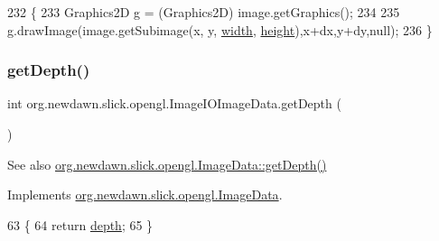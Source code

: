 \begin{DoxyCode}
232                                                                                                     \{
233         Graphics2D g = (Graphics2D) image.getGraphics();
234         
235         g.drawImage(image.getSubimage(x, y, \mbox{\hyperlink{classorg_1_1newdawn_1_1slick_1_1opengl_1_1_image_i_o_image_data_a4455bbf2c2f9c41df712d067260288f3}{width}}, \mbox{\hyperlink{classorg_1_1newdawn_1_1slick_1_1opengl_1_1_image_i_o_image_data_af79cc456f73fe9b84d5803f4fb41348b}{height}}),x+dx,y+dy,null);
236     \}
\end{DoxyCode}
\mbox{\label{classorg_1_1newdawn_1_1slick_1_1opengl_1_1_image_i_o_image_data_afd522d9f35ccf5827cdeb75eade55d6f}} 
\subsubsection{\texorpdfstring{get\+Depth()}{getDepth()}}
{\footnotesize\ttfamily int org.\+newdawn.\+slick.\+opengl.\+Image\+I\+O\+Image\+Data.\+get\+Depth (\begin{DoxyParamCaption}{ }\end{DoxyParamCaption})\hspace{0.3cm}{\ttfamily [inline]}}

\begin{DoxySeeAlso}{See also}
\mbox{\hyperlink{interfaceorg_1_1newdawn_1_1slick_1_1opengl_1_1_image_data_a69be40348e05222e8f0c65f5845adcb9}{org.\+newdawn.\+slick.\+opengl.\+Image\+Data\+::get\+Depth()}} 
\end{DoxySeeAlso}


Implements \mbox{\hyperlink{interfaceorg_1_1newdawn_1_1slick_1_1opengl_1_1_image_data_a69be40348e05222e8f0c65f5845adcb9}{org.\+newdawn.\+slick.\+opengl.\+Image\+Data}}.


\begin{DoxyCode}
63                           \{
64         \textcolor{keywordflow}{return} \mbox{\hyperlink{classorg_1_1newdawn_1_1slick_1_1opengl_1_1_image_i_o_image_data_a9732e4c418ef7044cb5ee44f1a6e5f69}{depth}};
65     \}
\end{DoxyCode}
\mbox{\label{classorg_1_1newdawn_1_1slick_1_1opengl_1_1_image_i_o_image_data_a9c15548c1f9ec6b5d591f44198c5722f}} 
